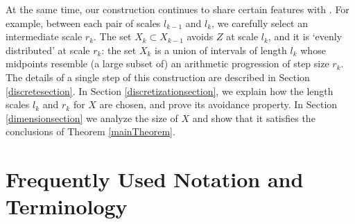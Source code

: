 \documentclass[dvipsnames,letterpaper,12pt]{article}
\numberwithin{equation}{section}
\theoremstyle{plain}
\theoremstyle{remark}
\begin{document}
		At the same time, our construction continues to share certain features with \cite{MalabikaRob}. For example, between each pair of scales $l_{k-1}$ and $l_{k}$, we carefully select an intermediate scale $r_{k}$. The set $X_{k}\subset X_{k-1}$ avoids $Z$ at scale $l_{k}$, and it is `evenly distributed' at scale $r_k$: the set $X_{k}$ is a union of intervals of length $l_{k}$ whose midpoints resemble (a large subset of) an arithmetic progression of step size $r_k$. The details of a single step of this construction are described in Section \ref{discretesection}. In Section \ref{discretizationsection}, we explain how the length scales $l_k$ and $r_k$ for $X$ are chosen, and prove its avoidance property. In Section \ref{dimensionsection} we analyze the size of $X$ and show that it satisfies the conclusions of Theorem \ref{mainTheorem}.





\section{Frequently Used Notation and Terminology}\label{notationSection}

\end{document}
